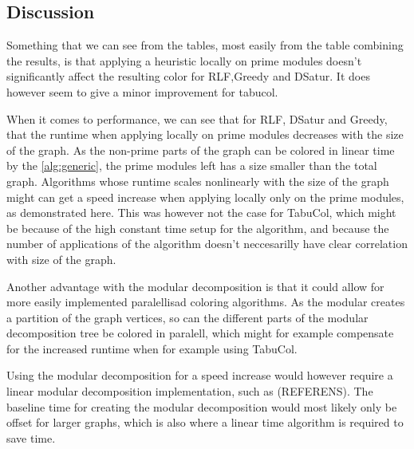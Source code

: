 \documentclass{amsart}
\begin{document}
\FloatBarrier
\subsection{Discussion}

Something that we can see from the tables, most easily from the table combining
the results, is that applying a heuristic locally on prime modules doesn't
significantly affect the resulting color for RLF,Greedy and DSatur. It does
however seem to give a minor improvement for tabucol. 

When it comes to performance, we can see that for RLF, DSatur and Greedy, that
the runtime when applying locally on prime modules decreases with the size of
the graph.  As the non-prime parts of the graph can be colored in linear time by
the \autoref{alg:generic}, the prime modules left has a size smaller than the
total graph.  Algorithms whose runtime scales nonlinearly with the size of the
graph might can get a speed increase when applying locally only on the prime
modules, as demonstrated here.  This was however not the case for TabuCol, which
might be because of the high constant time setup for the algorithm, and because
the number of applications of the algorithm doesn't neccesarilly have clear
correlation with size of the graph.

Another advantage with the modular decomposition is that it could allow for more
easily implemented paralellisad coloring algorithms. As the modular creates a
partition of the graph vertices, so can the different parts of the modular
decomposition tree be colored in paralell, which might for example compensate
for the increased runtime when for example using TabuCol.

Using the modular decomposition for a speed increase would however require a
linear modular decomposition implementation, such as (REFERENS).  The baseline
time for creating the modular decomposition would most likely only be offset for
larger graphs, which is also where a linear time algorithm is required to save
time.

\printbibliography
\end{document}
